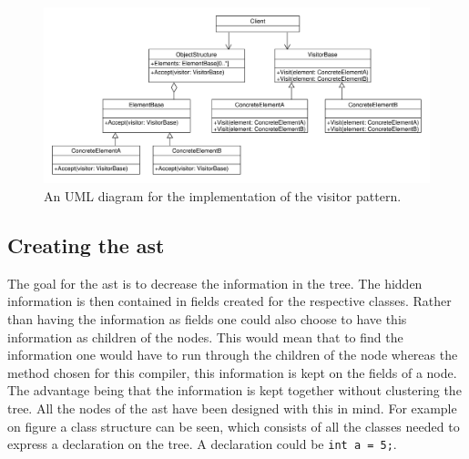 \begin{figure}[!ht]
\centering
 \includegraphics[width=1\textwidth]{figures/ClassDiagrams/VisitorPattern.pdf} %
\caption{An UML diagram for the implementation of the visitor pattern.}\label{image:visitor}
\vspace{-15pt}
\end{figure}


\subsection{Creating the \acrshort{ast}}\label{CreatingAst}

The goal for the \acrshort{ast} is to decrease the information in the tree.
The hidden information is then contained in fields created for the respective classes.
Rather than having the information as fields one could also choose to have this information as children of the nodes.
This would mean that to find the information one would have to run through the children of the node whereas the method chosen for this compiler, this information is kept on the fields of a node.
The advantage being that the information is kept together without clustering the tree.
All the nodes of the \acrshort{ast} have been designed with this in mind.
For example on figure  a class structure can be seen, which consists of all the classes needed to express a declaration on the tree.
A declaration could be \texttt{int a = 5;}.

